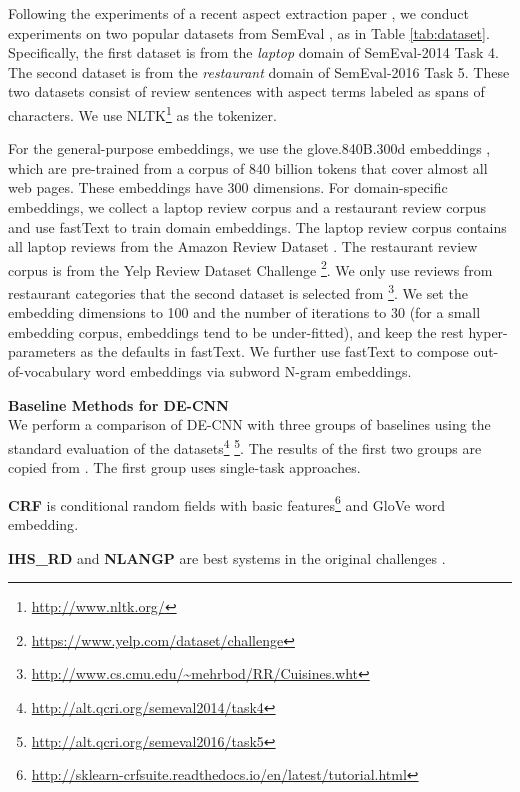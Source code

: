 Following the experiments of a recent aspect extraction paper \cite{li2017deep},
we conduct experiments on two popular datasets from SemEval \cite{pontiki2014SemEval,pontiki2016semeval}, as in Table \ref{tab:dataset}. 
Specifically, the first dataset is from the \textit{laptop} domain of SemEval-2014 Task 4.
The second dataset is from the \textit{restaurant} domain of SemEval-2016 Task 5.
These two datasets consist of review sentences with aspect terms labeled as spans of characters.
We use NLTK\footnote{\url{http://www.nltk.org/} } as the tokenizer. 

For the general-purpose embeddings, we use the glove.840B.300d embeddings \cite{pennington2014glove}, which are pre-trained from a corpus of 840 billion tokens that cover almost all web pages. These embeddings have 300 dimensions.
For domain-specific embeddings, we collect a laptop review corpus and a restaurant review corpus and use fastText \cite{bojanowski2016enriching} to train domain embeddings.  
The laptop review corpus contains all laptop reviews from the Amazon Review Dataset \cite{he2016ups}.
The restaurant review corpus is from the Yelp Review Dataset Challenge \footnote{\url{https://www.yelp.com/dataset/challenge} }.
We only use reviews from restaurant categories that the second dataset is selected from \footnote{\url{http://www.cs.cmu.edu/~mehrbod/RR/Cuisines.wht} }.
We set the embedding dimensions to 100 and the number of iterations to 30 (for a small embedding corpus, embeddings tend to be under-fitted), and keep the rest hyper-parameters as the defaults in fastText.
We further use fastText to compose out-of-vocabulary word embeddings via subword N-gram embeddings.

\textbf{Baseline Methods for DE-CNN}\\
We perform a comparison of DE-CNN with three groups of baselines using the standard evaluation of the datasets\footnote{\url{http://alt.qcri.org/semeval2014/task4}} \footnote{\url{http://alt.qcri.org/semeval2016/task5}}.
The results of the first two groups are copied from \cite{li2017deep}.
The first group uses single-task approaches.

\textbf{CRF} is conditional random fields with basic features\footnote{\url{http://sklearn-crfsuite.readthedocs.io/en/latest/tutorial.html} } and GloVe word embedding\cite{pennington2014glove}.

\textbf{IHS\_RD} \cite{chernyshevich2014ihs} and \textbf{NLANGP} \cite{toh2016nlangp} are best systems in the original challenges \cite{pontiki2014SemEval,pontiki2016semeval}.

